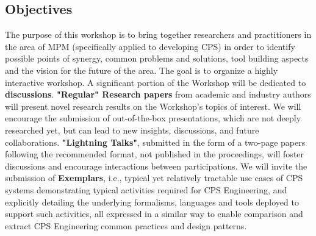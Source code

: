 
\subsection{Objectives}
The purpose of this workshop is to bring together researchers and practitioners 
in the area of MPM (specifically applied to developing CPS) in 
order to identify possible points of synergy, common problems and solutions, 
tool building aspects and the vision for the future of the area.
The goal is to organize a highly interactive workshop. A significant portion of 
the Workshop will be dedicated to \textbf{discussions}. \textbf{"Regular" Research 
papers} from academic and industry authors will present novel research results 
on the Workshop's topics of interest. We will encourage the submission of 
out-of-the-box presentations, which are not deeply researched yet, but can lead 
to new insights, discussions, and future collaborations.
\textbf{"Lightning Talks"}, submitted in the form of a two-page papers following
the recommended format, not published in the proceedings, will foster discussions
and encourage interactions between participations. 
We will invite the submission of \textbf{Exemplars}, i.e., typical yet relatively
tractable use cases of CPS systems demonstrating typical activities required for
CPS Engineering, and explicitly detailing the underlying formalisms, languages and
tools deployed to support such activities, all expressed in a similar way to enable
comparison and extract CPS Engineering common practices and design patterns.


